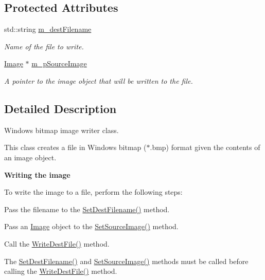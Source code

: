\subsection*{Protected Attributes}
\begin{DoxyCompactItemize}
\item 
std\+::string \hyperlink{classnoise_1_1utils_1_1_writer_b_m_p_a2cfd3c61d9db75807eb516626e35d4fd}{m\+\_\+dest\+Filename}
\begin{DoxyCompactList}\small\item\em Name of the file to write. \end{DoxyCompactList}\item 
\hyperlink{classnoise_1_1utils_1_1_image}{Image} $\ast$ \hyperlink{classnoise_1_1utils_1_1_writer_b_m_p_a0023dafca9882acd3702fb8f47781b9b}{m\+\_\+p\+Source\+Image}
\begin{DoxyCompactList}\small\item\em A pointer to the image object that will be written to the file. \end{DoxyCompactList}\end{DoxyCompactItemize}


\subsection{Detailed Description}
Windows bitmap image writer class.

This class creates a file in Windows bitmap ($\ast$.bmp) format given the contents of an image object.

{\bfseries Writing the image}

To write the image to a file, perform the following steps\+:
\begin{DoxyItemize}
\item Pass the filename to the \hyperlink{classnoise_1_1utils_1_1_writer_b_m_p_a02ef2f6be88d1636bac1d3bf0c598393}{Set\+Dest\+Filename()} method.
\item Pass an \hyperlink{classnoise_1_1utils_1_1_image}{Image} object to the \hyperlink{classnoise_1_1utils_1_1_writer_b_m_p_a62957bc808604c20d0388212777a1b4b}{Set\+Source\+Image()} method.
\item Call the \hyperlink{classnoise_1_1utils_1_1_writer_b_m_p_adb6cc4cb2b5ce8ba4240ebfd54ad631c}{Write\+Dest\+File()} method.
\end{DoxyItemize}

The \hyperlink{classnoise_1_1utils_1_1_writer_b_m_p_a02ef2f6be88d1636bac1d3bf0c598393}{Set\+Dest\+Filename()} and \hyperlink{classnoise_1_1utils_1_1_writer_b_m_p_a62957bc808604c20d0388212777a1b4b}{Set\+Source\+Image()} methods must be called before calling the \hyperlink{classnoise_1_1utils_1_1_writer_b_m_p_adb6cc4cb2b5ce8ba4240ebfd54ad631c}{Write\+Dest\+File()} method. 

